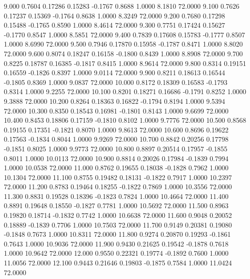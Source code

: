    9.000   0.7604   0.17286   0.15283  -0.1767   0.8688   1.0000   8.1810  72.0000
   9.100   0.7626   0.17237   0.15369  -0.1764   0.8638   1.0000   8.3249  72.0000
   9.200   0.7680   0.17298   0.15488  -0.1765   0.8590   1.0000   8.4614  72.0000
   9.300   0.7751   0.17424   0.15627  -0.1770   0.8547   1.0000   8.5851  72.0000
   9.400   0.7839   0.17608   0.15783  -0.1777   0.8507   1.0000   8.6990  72.0000
   9.500   0.7946   0.17870   0.15958  -0.1787   0.8471   1.0000   8.8020  72.0000
   9.600   0.8074   0.18247   0.16158  -0.1800   0.8439   1.0000   8.8908  72.0000
   9.700   0.8225   0.18787   0.16385  -0.1817   0.8415   1.0000   8.9614  72.0000
   9.800   0.8314   0.19151   0.16559  -0.1826   0.8397   1.0000   9.0114  72.0000
   9.900   0.8211   0.18613   0.16544  -0.1805   0.8369   1.0000   9.0837  72.0000
  10.000   0.8172   0.18309   0.16583  -0.1793   0.8314   1.0000   9.2255  72.0000
  10.100   0.8201   0.18271   0.16686  -0.1791   0.8252   1.0000   9.3888  72.0000
  10.200   0.8264   0.18363   0.16822  -0.1794   0.8194   1.0000   9.5394  72.0000
  10.300   0.8350   0.18543   0.16981  -0.1801   0.8143   1.0000   9.6699  72.0000
  10.400   0.8453   0.18806   0.17159  -0.1810   0.8102   1.0000   9.7776  72.0000
  10.500   0.8568   0.19155   0.17351  -0.1821   0.8070   1.0000   9.8613  72.0000
  10.600   0.8696   0.19622   0.17563  -0.1834   0.8044   1.0000   9.9269  72.0000
  10.700   0.8842   0.20256   0.17798  -0.1851   0.8025   1.0000   9.9773  72.0000
  10.800   0.8897   0.20514   0.17957  -0.1855   0.8011   1.0000  10.0113  72.0000
  10.900   0.8814   0.20026   0.17984  -0.1839   0.7994   1.0000  10.0538  72.0000
  11.000   0.8762   0.19655   0.18038  -0.1828   0.7962   1.0000  10.1304  72.0000
  11.100   0.8755   0.19482   0.18131  -0.1822   0.7917   1.0000  10.2397  72.0000
  11.200   0.8783   0.19464   0.18255  -0.1822   0.7869   1.0000  10.3556  72.0000
  11.300   0.8831   0.19528   0.18396  -0.1823   0.7824   1.0000  10.4664  72.0000
  11.400   0.8891   0.19648   0.18550  -0.1827   0.7781   1.0000  10.5692  72.0000
  11.500   0.8963   0.19820   0.18714  -0.1832   0.7742   1.0000  10.6638  72.0000
  11.600   0.9048   0.20052   0.18889  -0.1839   0.7706   1.0000  10.7503  72.0000
  11.700   0.9149   0.20381   0.19080  -0.1848   0.7673   1.0000  10.8311  72.0000
  11.800   0.9274   0.20870   0.19293  -0.1861   0.7643   1.0000  10.9036  72.0000
  11.900   0.9430   0.21625   0.19542  -0.1878   0.7618   1.0000  10.9642  72.0000
  12.000   0.9550   0.22321   0.19774  -0.1892   0.7600   1.0000  11.0056  72.0000
  12.100   0.9443   0.21646   0.19803  -0.1875   0.7584   1.0000  11.0424  72.0000
